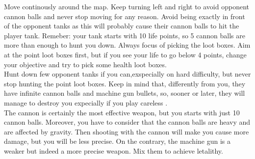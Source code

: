 \documentclass[14pt]{article}
\begin{document}
Move continously around the map. Keep turning left and right to avoid opponent cannon balls and never stop moving for any reason. Avoid being exactly in front of the opponent tanks as this will probably cause their cannon balls to hit the player tank. Remeber: your tank starts with 10 life points, so 5 cannon balls are more than enough to hunt you down. Always focus of picking the loot boxes. Aim at the point loot boxes first, but if you see your life to go below 4 points, change your objective and try to pick some health loot boxes.\\
Hunt down few opponent tanks if you can,exspecially on hard difficulty, but never stop hunting the point loot boxes. Keep in mind that, differently from you, they have infinite cannon balls and machine gun bullets, so, sooner or later, they will manage to destroy you expecially if you play careless . \\
The cannon is certainly the most effective weapon, but you starts with just 10 cannon balls. Moreover, you have to consider that the cannon balls are heavy and are affected by gravity. Then shooting with the cannon will make you cause more damage, but you will be less precise. On the contrary, the machine gun is a weaker but indeed a  more precise weapon. Mix them to achieve letalithy.
\end{document}
